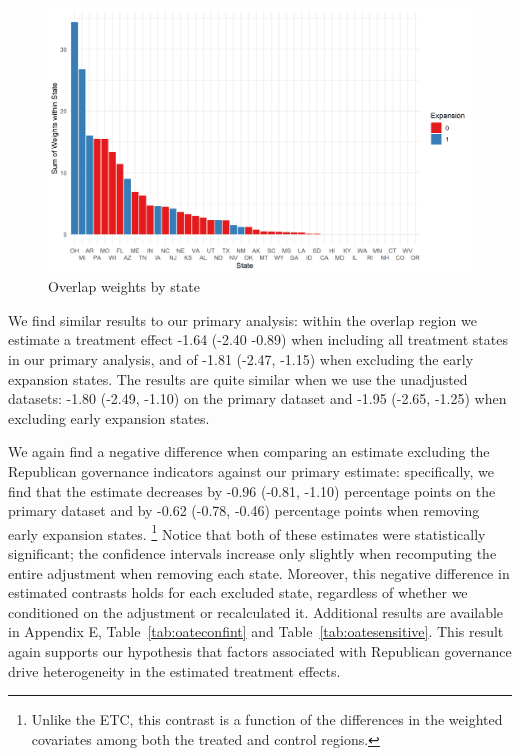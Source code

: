 \documentclass{article}
\begin{document}
\begin{figure}
\begin{center}
    \caption{Overlap weights by state}
    \label{oatearea}
    \includegraphics[scale=0.6]{01_Plots/oate-region-c1-a.png}
\end{center}
\end{figure}

We find similar results to our primary analysis: within the overlap region we estimate a treatment effect -1.64 (-2.40 -0.89) when including all treatment states in our primary analysis, and of -1.81 (-2.47, -1.15) when excluding the early expansion states. The results are quite similar when we use the unadjusted datasets: -1.80 (-2.49, -1.10) on the primary dataset and -1.95 (-2.65, -1.25) when excluding early expansion states. 

We again find a negative difference when comparing an estimate excluding the Republican governance indicators against our primary estimate: specifically, we find that the estimate decreases by -0.96 (-0.81, -1.10) percentage points on the primary dataset and by -0.62 (-0.78, -0.46) percentage points when removing early expansion states. \footnote{Unlike the ETC, this contrast is a function of the differences in the weighted covariates among both the treated and control regions.} Notice that both of these estimates were statistically significant; the confidence intervals increase only slightly when recomputing the entire adjustment when removing each state. Moreover, this negative difference in estimated contrasts holds for each excluded state, regardless of whether we conditioned on the adjustment or recalculated it. Additional results are available in Appendix E, Table~\ref{tab:oateconfint} and Table~\ref{tab:oatesensitive}. This result again supports our hypothesis that factors associated with Republican governance drive heterogeneity in the estimated treatment effects.
\end{document}
